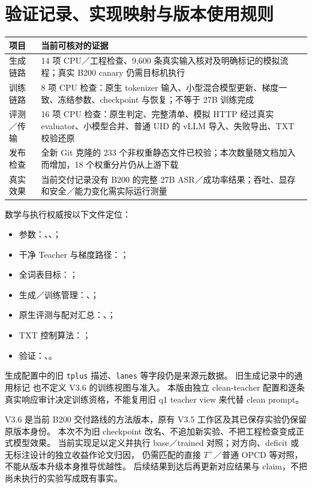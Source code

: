 \documentclass[11pt,a4paper]{ctexart}
\begin{document}
\section{验证记录、实现映射与版本使用规则}
\begin{center}
\begin{tabularx}{\textwidth}{p{}Y}
\toprule
项目 & 当前可核对的证据 \\
\midrule
生成链路 & 14 项 CPU／工程检查、9,600 条真实输入核对及明确标记的模拟流程；真实 B200 canary 仍需目标机执行 \\
训练链路 & 8 项 CPU 检查：原生 tokenizer 输入、小型混合模型更新、梯度一致、冻结参数、checkpoint 与恢复；不等于 27B 训练完成 \\
评测／传输 & 16 项 CPU 检查：原生判定、完整清单、模拟 HTTP 经过真实 evaluator、小模型合并、普通 UID 的 vLLM 导入、失败导出、TXT 校验还原 \\
发布检查 & 全新 Git 克隆的 233 个非权重静态文件已校验；本次数量随文档加入而增加，18 个权重分片仍从上游下载 \\
真实效果 & 当前交付记录没有 B200 的完整 27B ASR／成功率结果；吞吐、显存和安全／能力变化需实际运行测量 \\
\bottomrule
\end{tabularx}
\end{center}

数学与执行权威按以下文件定位：
\begin{itemize}
\item 参数：、、；
\item 干净 Teacher 与梯度路径：；
\item 全词表目标：；
\item 生成／训练管理：、；
\item 原生评测与配对汇总：、；
\item TXT 控制算法：；
\item 验证：、。
\end{itemize}
生成配置中的旧 \texttt{tplus} 描述、\texttt{lanes} 等字段仍是来源元数据。
旧生成记录中的通用标记  也不定义 V3.6 的训练视图与准入。
本版由独立 clean-teacher 配置和逐条真实响应审计决定训练资格，不能复用旧 q1 teacher view 来代替 clean prompt。

\begin{contractbox}[版本与结论范围]
V3.6 是当前 B200 交付路线的方法版本，原有 V3.5 工作区及其已保存实验仍保留原版本身份。
本次不为旧 checkpoint 改名、不追加新实验、不把工程检查变成正式模型效果。
当前实现足以定义并执行 base／trained 对照；对方向、deficit 或无标注设计的独立收益作论文归因，
仍需匹配的直接 $T^+$／普通 OPCD 等对照，不能从版本升级本身推导优越性。
后续结果到达后再更新对应结果与 claim，不把尚未执行的实验写成既有事实。
\end{contractbox}
\end{document}
